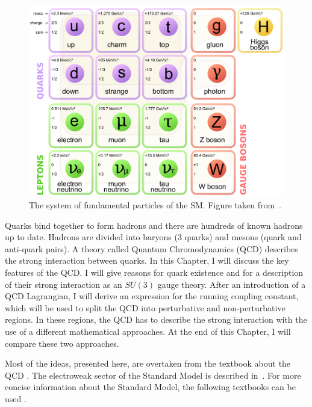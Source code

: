 \begin{figure}[t]
  \centering
  \includegraphics[width=\textwidth]{Chapter1/SM.png} 
  \caption[The system of fundamental particles of the SM.]
          {The system of fundamental particles of the SM. Figure taken
           from~\cite{wiki:SMParticlesSource}.} 
  \label{fig:SMparticles}
\end{figure}

Quarks bind together to form hadrons and there are hundreds
\cite{PDG2014} of known hadrons up to date. Hadrons are
divided into baryons (3 quarks) and mesons (quark and anti-quark pairs). 
A theory called Quantum Chromodynamics (QCD) describes the strong interaction
between quarks.  
In this Chapter, I will discuss the key features of the QCD. 
I will give reasons for quark existence and for a description of their strong
interaction as an $SU(3)$ gauge theory. 
After an introduction of a QCD Lagrangian, I will derive an expression for the
running coupling constant, which will be used to split the QCD into perturbative
and non-perturbative regions. 
In these regions, the QCD has to describe the strong interaction with the use of
a different mathematical approaches. 
At the end of this Chapter, I will compare
these two approaches.

Most of the ideas, presented here, are overtaken from the textbook 
about the QCD \cite{QCDTextbook}. 
The electroweak sector of the Standard Model is described
in~\cite{horejsi2002fundamentals}. 
For more concise information about the Standard Model, the following textbooks
can be used \cite{griffiths2008introduction,cottingham2007introduction}.

